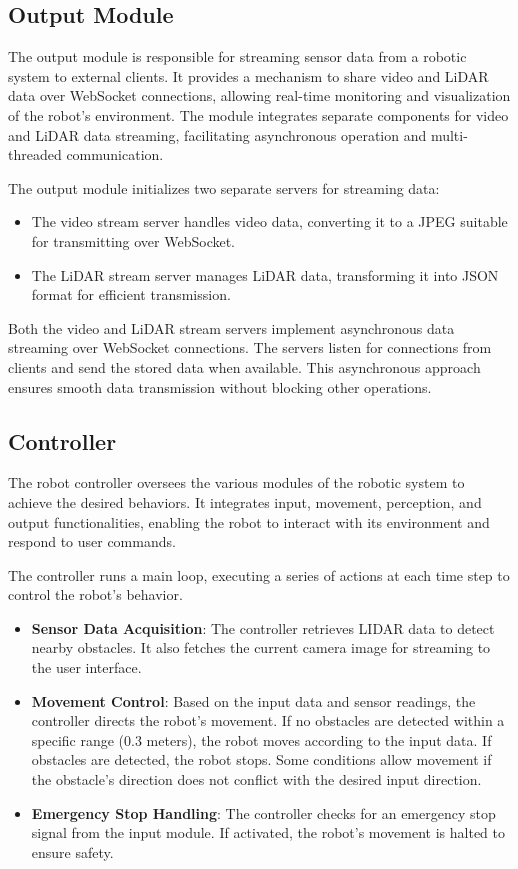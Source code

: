 \documentclass{article}
\begin{document}
\subsection{Output Module}
The output module is responsible for streaming sensor data from a robotic system to external clients. It provides a mechanism to share video and LiDAR data over WebSocket connections, allowing real-time monitoring and visualization of the robot's environment. The module integrates separate components for video and LiDAR data streaming, facilitating asynchronous operation and multi-threaded communication.

The output module initializes two separate servers for streaming data:
\begin{itemize}
    \item The video stream server handles video data, converting it to a JPEG suitable for transmitting over WebSocket.
    \item The LiDAR stream server manages LiDAR data, transforming it into JSON format for efficient transmission.
\end{itemize}

Both the video and LiDAR stream servers implement asynchronous data streaming over WebSocket connections. The servers listen for connections from clients and send the stored data when available. This asynchronous approach ensures smooth data transmission without blocking other operations.

\subsection{Controller}
The robot controller oversees the various modules of the robotic system to achieve the desired behaviors. It integrates input, movement, perception, and output functionalities, enabling the robot to interact with its environment and respond to user commands.

The controller runs a main loop, executing a series of actions at each time step to control the robot's behavior.

\begin{itemize}
    \item \textbf{Sensor Data Acquisition}: The controller retrieves LIDAR data to detect nearby obstacles. It also fetches the current camera image for streaming to the user interface.
    \item \textbf{Movement Control}: Based on the input data and sensor readings, the controller directs the robot's movement. If no obstacles are detected within a specific range (0.3 meters), the robot moves according to the input data. If obstacles are detected, the robot stops. Some conditions allow movement if the obstacle's direction does not conflict with the desired input direction.
    \item \textbf{Emergency Stop Handling}: The controller checks for an emergency stop signal from the input module. If activated, the robot's movement is halted to ensure safety.
\end{itemize}
\end{document}
